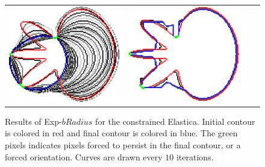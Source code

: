 \begin{figure}
\begin{tabular}{cccc}
\includegraphics[scale=0.2]{figures/chapter9/constrained-elastica/graphflow/flower-2/len_pen-0.0002/radius-7/N-1/h1.0/summary.pdf} &
\includegraphics[scale=0.2]{figures/chapter9/constrained-elastica/graphflow/flower-2/len_pen-0.0002/radius-50/N-1/h1.0/summary.pdf}\\


\end{tabular}
\caption{Results of Exp-$bRadius$ for the constrained Elastica. Initial contour is colored in red and final contour is colored in blue. The green pixels indicates pixels forced to persist in the final contour, or a forced orientation. Curves are drawn every $10$ iterations.}
\label{fig:results-constrained-elastica-radius}
\end{figure}


